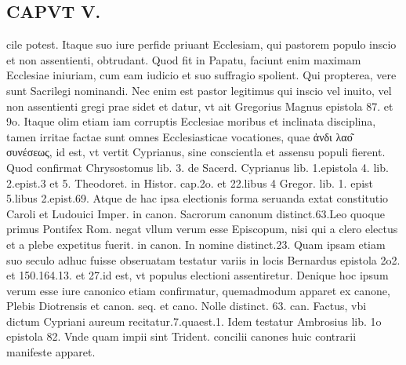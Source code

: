 \documentclass{article}
\begin{document}
\begin{pages}
\section*{CAPVT  V. }
\marginpar{[ p.35  ]}\pstart cile potest. Itaque suo iure perfide priuant Ecclesiam, qui pastorem populo inscio et non assentienti, obtrudant. Quod fit in Papatu, faciunt enim maximam Ecclesiae iniuriam, cum eam iudicio et suo suffragio spolient. Qui propterea, vere sunt Sacrilegi nominandi. Nec enim est pastor legitimus qui inscio vel inuito, vel non assentienti gregi prae sidet et datur, vt ait Gregorius Magnus epistola 87. et 9o. Itaque olim etiam iam corruptis Ecclesiae moribus et inclinata disciplina, tamen irritae factae sunt omnes Ecclesiasticae vocationes, quae ἀνδι λαο͂ συνέσεως, id est, vt vertit Cyprianus, sine conscientla et assensu populi fierent. Quod confirmat Chrysostomus lib. 3. de Sacerd. Cyprianus lib. 1.epistola 4. lib. 2.epist.3 et 5. Theodoret. in Histor. cap.2o. et 22.libus 4 Gregor. lib. 1. epist 5.libus 2.epist.69. Atque de hac ipsa electionis forma seruanda extat constitutio Caroli et Ludouici Imper. in canon. Sacrorum canonum distinct.63.Leo quoque primus Pontifex Rom. negat vllum verum esse Episcopum, nisi qui a clero electus et a plebe expetitus fuerit. in canon. In nomine distinct.23. Quam ipsam etiam suo seculo adhuc fuisse obseruatam testatur variis in locis Bernardus epistola 2o2. et 150.164.13. et 27.id est, vt populus electioni assentiretur. Denique hoc ipsum verum esse iure canonico etiam confirmatur, quemadmodum apparet ex canone, Plebis Diotrensis et canon. seq. et cano. Nolle distinct. 63. can. Factus, vbi dictum Cypriani aureum recitatur.7.quaest.1. Idem testatur Ambrosius lib. 1o epistola 82. Vnde quam impii sint Trident. concilii canones huic contrarii manifeste apparet.  \pend

\end{pages}
\end{document}
